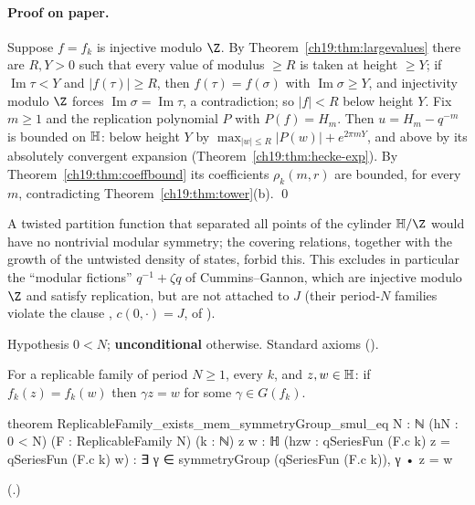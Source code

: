 \paragraph{Proof on paper.}  Suppose $f=f_k$ is injective modulo $\Z$.  By Theorem~\ref{ch19:thm:largevalues} there are $R,Y>0$ such
that every value of modulus $\ge R$ is taken at height $\ge Y$; if $\operatorname{Im}\tau<Y$ and $|f(\tau)|\ge R$, then $f(\tau)=f(\sigma)$ with
$\operatorname{Im}\sigma\ge Y$, and injectivity modulo $\Z$ forces $\operatorname{Im}\sigma=\operatorname{Im}\tau$, a contradiction; so $|f|<R$ below
height $Y$.  Fix $m\ge1$ and the replication polynomial $P$ with $P(f)=H_m$.  Then $u=H_m-q^{-m}$ is bounded on $\mathbb{H}$: below
height $Y$ by $\max_{|w|\le R}|P(w)|+e^{2\pi mY}$, and above by its absolutely convergent expansion (Theorem~\ref{ch19:thm:hecke-exp}).
By Theorem~\ref{ch19:thm:coeffbound} its coefficients $\rho_k(m,r)$ are bounded, for every $m$, contradicting
Theorem~\ref{ch19:thm:tower}(b). \qed
\begin{physics}A twisted partition function that separated all points of the cylinder $\chnineteenH/\Z$ would have no
nontrivial modular symmetry; the covering relations, together with the growth of the untwisted density of states, forbid
this.  This excludes in particular the ``modular fictions'' $q^{-1}+\zeta q$ of Cummins--Gannon, which are injective modulo
$\Z$ and satisfy replication, but are not attached to $J$ (their period-$N$ families violate the clause , $c(0,\cdot)=J$, of ).\end{physics}
\begin{status}Hypothesis $0<N$; \textbf{unconditional} otherwise.  Standard axioms
().\end{status}

\begin{theorem}\label{ch19:thm:propPLR}
For a replicable family of period $N\ge1$, every $k$, and $z,w\in\mathbb{H}$: if $f_k(z)=f_k(w)$ then $\gamma z=w$ for some $\gamma\in
G(f_k)$.
\end{theorem}
\begin{leancode}
theorem ReplicableFamily_exists_mem_symmetryGroup_smul_eq {N : ℕ} (hN : 0 < N)
    (F : ReplicableFamily N) (k : ℕ) {z w : ℍ}
    (hzw : qSeriesFun (F.c k) z = qSeriesFun (F.c k) w) :
    ∃ γ ∈ symmetryGroup (qSeriesFun (F.c k)), γ • z = w
\end{leancode}
(.)
